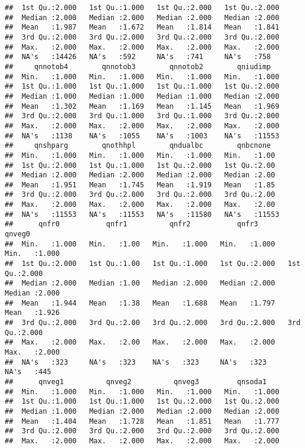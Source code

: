 \documentclass[
]{article}
\begin{document}
\begin{verbatim}
##  1st Qu.:2.000   1st Qu.:1.000   1st Qu.:2.000   1st Qu.:2.000  
##  Median :2.000   Median :2.000   Median :2.000   Median :2.000  
##  Mean   :1.987   Mean   :1.672   Mean   :1.814   Mean   :1.841  
##  3rd Qu.:2.000   3rd Qu.:2.000   3rd Qu.:2.000   3rd Qu.:2.000  
##  Max.   :2.000   Max.   :2.000   Max.   :2.000   Max.   :2.000  
##  NA's   :14426   NA's   :592     NA's   :741     NA's   :758    
##     qnnotob4        qnnotob3        qnnotob2        qniudimp    
##  Min.   :1.000   Min.   :1.000   Min.   :1.000   Min.   :1.000  
##  1st Qu.:1.000   1st Qu.:1.000   1st Qu.:1.000   1st Qu.:2.000  
##  Median :1.000   Median :1.000   Median :1.000   Median :2.000  
##  Mean   :1.302   Mean   :1.169   Mean   :1.145   Mean   :1.969  
##  3rd Qu.:2.000   3rd Qu.:1.000   3rd Qu.:1.000   3rd Qu.:2.000  
##  Max.   :2.000   Max.   :2.000   Max.   :2.000   Max.   :2.000  
##  NA's   :1138    NA's   :1055    NA's   :1003    NA's   :11553  
##     qnshparg        qnothhpl        qndualbc        qnbcnone    
##  Min.   :1.000   Min.   :1.000   Min.   :1.000   Min.   :1.00   
##  1st Qu.:2.000   1st Qu.:1.000   1st Qu.:2.000   1st Qu.:2.00   
##  Median :2.000   Median :2.000   Median :2.000   Median :2.00   
##  Mean   :1.951   Mean   :1.745   Mean   :1.919   Mean   :1.85   
##  3rd Qu.:2.000   3rd Qu.:2.000   3rd Qu.:2.000   3rd Qu.:2.00   
##  Max.   :2.000   Max.   :2.000   Max.   :2.000   Max.   :2.00   
##  NA's   :11553   NA's   :11553   NA's   :11580   NA's   :11553  
##      qnfr0           qnfr1          qnfr2           qnfr3           qnveg0     
##  Min.   :1.000   Min.   :1.00   Min.   :1.000   Min.   :1.000   Min.   :1.000  
##  1st Qu.:2.000   1st Qu.:1.00   1st Qu.:1.000   1st Qu.:2.000   1st Qu.:2.000  
##  Median :2.000   Median :1.00   Median :2.000   Median :2.000   Median :2.000  
##  Mean   :1.944   Mean   :1.38   Mean   :1.688   Mean   :1.797   Mean   :1.926  
##  3rd Qu.:2.000   3rd Qu.:2.00   3rd Qu.:2.000   3rd Qu.:2.000   3rd Qu.:2.000  
##  Max.   :2.000   Max.   :2.00   Max.   :2.000   Max.   :2.000   Max.   :2.000  
##  NA's   :323     NA's   :323    NA's   :323     NA's   :323     NA's   :445    
##      qnveg1          qnveg2          qnveg3         qnsoda1     
##  Min.   :1.000   Min.   :1.000   Min.   :1.000   Min.   :1.000  
##  1st Qu.:1.000   1st Qu.:1.000   1st Qu.:2.000   1st Qu.:2.000  
##  Median :1.000   Median :2.000   Median :2.000   Median :2.000  
##  Mean   :1.404   Mean   :1.728   Mean   :1.851   Mean   :1.777  
##  3rd Qu.:2.000   3rd Qu.:2.000   3rd Qu.:2.000   3rd Qu.:2.000  
##  Max.   :2.000   Max.   :2.000   Max.   :2.000   Max.   :2.000  

\end{verbatim}
\end{document}
